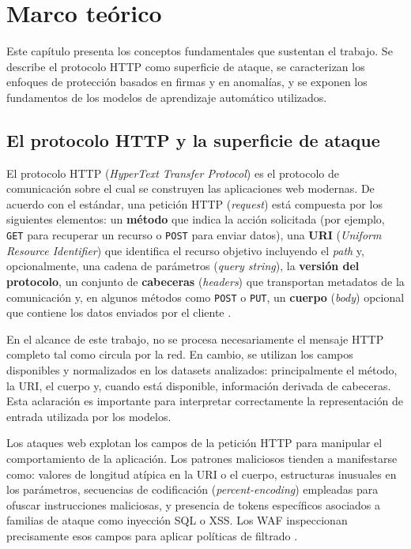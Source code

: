 \documentclass[12pt,oneside]{report}
\begin{document}
\chapter{Marco teórico}

Este capítulo presenta los conceptos fundamentales que sustentan el trabajo. Se describe el protocolo HTTP como superficie de ataque, se caracterizan los enfoques de protección basados en firmas y en anomalías, y se exponen los fundamentos de los modelos de aprendizaje automático utilizados.

\section{El protocolo HTTP y la superficie de ataque}

El protocolo HTTP (\textit{HyperText Transfer Protocol}) es el protocolo de comunicación sobre el cual se construyen las aplicaciones web modernas. De acuerdo con el estándar, una petición HTTP (\textit{request}) está compuesta por los siguientes elementos: un \textbf{método} que indica la acción solicitada (por ejemplo, \texttt{GET} para recuperar un recurso o \texttt{POST} para enviar datos), una \textbf{URI} (\textit{Uniform Resource Identifier}) que identifica el recurso objetivo incluyendo el \textit{path} y, opcionalmente, una cadena de parámetros (\textit{query string}), la \textbf{versión del protocolo}, un conjunto de \textbf{cabeceras} (\textit{headers}) que transportan metadatos de la comunicación y, en algunos métodos como \texttt{POST} o \texttt{PUT}, un \textbf{cuerpo} (\textit{body}) opcional que contiene los datos enviados por el cliente \cite{owasp_waf}.

En el alcance de este trabajo, no se procesa necesariamente el mensaje HTTP completo tal como circula por la red. En cambio, se utilizan los campos disponibles y normalizados en los datasets analizados: principalmente el método, la URI, el cuerpo y, cuando está disponible, información derivada de cabeceras. Esta aclaración es importante para interpretar correctamente la representación de entrada utilizada por los modelos.

Los ataques web explotan los campos de la petición HTTP para manipular el comportamiento de la aplicación. Los patrones maliciosos tienden a manifestarse como: valores de longitud atípica en la URI o el cuerpo, estructuras inusuales en los parámetros, secuencias de codificación (\textit{percent-encoding}) empleadas para ofuscar instrucciones maliciosas, y presencia de tokens específicos asociados a familias de ataque como inyección SQL o XSS. Los WAF inspeccionan precisamente esos campos para aplicar políticas de filtrado \cite{owasp_waf,modsecurity_site}.
\end{document}
